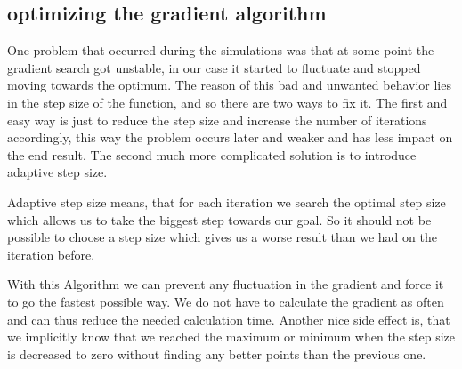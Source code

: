 \subsection{optimizing the gradient algorithm}
One problem that occurred during the simulations was that at some point the gradient search got unstable, in our case it started to fluctuate and stopped moving towards the optimum. The reason of this bad and unwanted behavior lies in the step size of the function, and so there are two ways to fix it. The first and easy way is just to reduce the step size and increase the number of iterations accordingly, this way the problem occurs later and weaker and has less impact on the end result. The second much more complicated solution is to introduce adaptive step size.

Adaptive step size means, that for each iteration we search the optimal step size which allows us to take the biggest step towards our goal. So it should not be possible to choose a step size which gives us a worse result than we had on the iteration before.
\begin{algorithm}
	{
	}
\end{algorithm}
With this Algorithm we can prevent any fluctuation in the gradient and force it to go the fastest possible way. We do not have to calculate the gradient as often and can thus reduce the needed calculation time. Another nice side effect is, that we implicitly know that we reached the maximum or minimum when the step size is decreased to zero without finding any better points than the previous one.